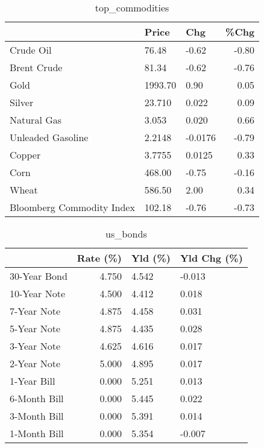 \documentclass{article}%
\begin{document}
\begin{table}[htbp]%
\caption{top\_commodities}%
\centering%
\begin{adjustbox}{width=1\textwidth}%
\begin{tabular}{lllr}
\toprule
                          &   Price &     Chg &  \%Chg \\
\midrule
               Crude Oil  &   76.48 &   -0.62 & -0.80 \\
             Brent Crude  &   81.34 &   -0.62 & -0.76 \\
                    Gold  & 1993.70 &    0.90 &  0.05 \\
                  Silver  &  23.710 &   0.022 &  0.09 \\
             Natural Gas  &   3.053 &   0.020 &  0.66 \\
       Unleaded Gasoline  &  2.2148 & -0.0176 & -0.79 \\
                  Copper  &  3.7755 &  0.0125 &  0.33 \\
                    Corn  &  468.00 &   -0.75 & -0.16 \\
                   Wheat  &  586.50 &    2.00 &  0.34 \\
Bloomberg Commodity Index &  102.18 &   -0.76 & -0.73 \\
\bottomrule
\end{tabular}
%
\end{adjustbox}%
\end{table}

%


\begin{table}[htbp]%
\caption{us\_bonds}%
\centering%
\begin{adjustbox}{width=1\textwidth}%
\begin{tabular}{lrll}
\toprule
             &  Rate (\%) & Yld (\%) & Yld Chg (\%) \\
\midrule
30-Year Bond &     4.750 &   4.542 &      -0.013 \\
10-Year Note &     4.500 &   4.412 &       0.018 \\
 7-Year Note &     4.875 &   4.458 &       0.031 \\
 5-Year Note &     4.875 &   4.435 &       0.028 \\
 3-Year Note &     4.625 &   4.616 &       0.017 \\
 2-Year Note &     5.000 &   4.895 &       0.017 \\
 1-Year Bill &     0.000 &   5.251 &       0.013 \\
6-Month Bill &     0.000 &   5.445 &       0.022 \\
3-Month Bill &     0.000 &   5.391 &       0.014 \\
1-Month Bill &     0.000 &   5.354 &      -0.007 \\
\bottomrule
\end{tabular}
%
\end{adjustbox}%
\end{table}
\end{document}
